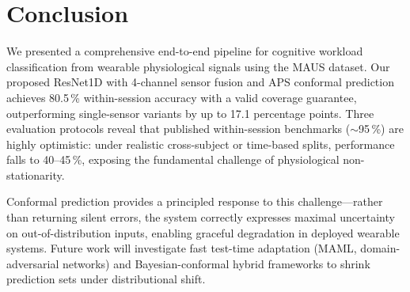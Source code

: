 \documentclass[conference]{IEEEtran}
\begin{document}
\section{Conclusion}
\label{sec:conclusion}

We presented a comprehensive end-to-end pipeline for cognitive workload classification from wearable physiological signals using the MAUS dataset. Our proposed ResNet1D with 4-channel sensor fusion and APS conformal prediction achieves 80.5\,\% within-session accuracy with a valid coverage guarantee, outperforming single-sensor variants by up to 17.1 percentage points. Three evaluation protocols reveal that published within-session benchmarks ($\sim$95\,\%) are highly optimistic: under realistic cross-subject or time-based splits, performance falls to 40--45\,\%, exposing the fundamental challenge of physiological non-stationarity.

Conformal prediction provides a principled response to this challenge---rather than returning silent errors, the system correctly expresses maximal uncertainty on out-of-distribution inputs, enabling graceful degradation in deployed wearable systems. Future work will investigate fast test-time adaptation (MAML, domain-adversarial networks) and Bayesian-conformal hybrid frameworks to shrink prediction sets under distributional shift.



\end{document}
